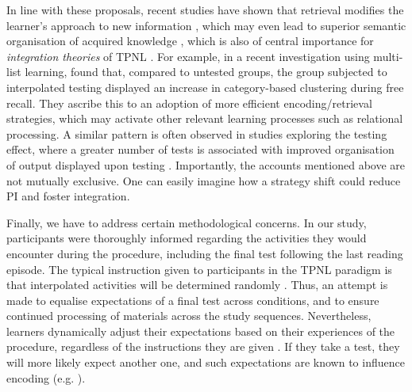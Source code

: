 \documentclass[../main.tex]{subfiles}
\begin{document}
In line with these proposals, recent studies have shown that retrieval 
modifies the learner's approach to new information 
\citep{choTestingEnhancesBoth2017, 
soderstromTestingFacilitatesRegulation2014}, which may even lead to
superior semantic organisation of acquired knowledge 
\citep{chanTestingPotentiatesNew2018, 
	jingInterpolatedTestingInfluences2016}, which is also of central
importance for \textit{integration theories} of TPNL 
\citep{chanRetrievalPotentiatesNew2018}. For example, in a 
recent investigation using multi-list learning, 
\cite{chanTestingPotentiatesNew2018} found that, compared to untested 
groups, the group subjected to interpolated testing displayed an increase in 
category-based clustering during free recall. They ascribe this to an 
adoption of more efficient encoding/retrieval strategies, which may activate 
other relevant learning processes such as relational processing. A similar 
pattern is often observed in studies exploring the testing effect, where a 
greater number of tests is associated with improved organisation of output 
displayed upon testing \citep{zarombTestingEffectFree2010, 
	karpickeRetrievalBasedLearningActive2012}. Importantly, the
accounts mentioned above are not mutually exclusive. One can easily imagine 
how a strategy shift could reduce PI and foster integration.


Finally, we have to address certain methodological concerns.  In our study, 
participants were thoroughly informed regarding the activities they would 
encounter during the procedure, including the final test following the last 
reading episode. The typical instruction given to participants in the TPNL 
paradigm is that interpolated activities will be determined randomly
\citep{yangEnhancingLearningRetrieval2018}. Thus, an attempt is made to 
equalise expectations of a final test across conditions, and to ensure 
continued processing of materials across the study sequences. Nevertheless, 
learners dynamically adjust their expectations based on their experiences of 
the procedure, regardless of the instructions they are given 
\citep{weinsteinRoleTestExpectancy2014}.  If they take a test, they will 
more likely expect another one, and such expectations are known to influence 
encoding (e.g. \citealp{szpunarExpectationFinalCumulative2007}).
\end{document}
